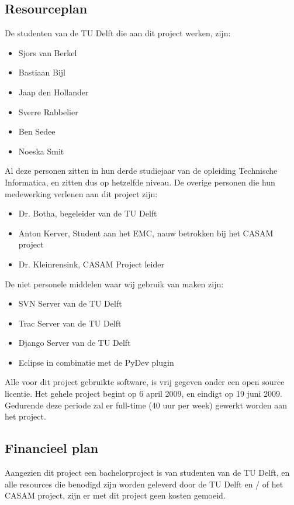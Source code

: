 \subsection{Resourceplan}
De studenten van de TU Delft die aan dit project werken, zijn:
\begin{itemize}
	\item Sjors van Berkel
	\item Bastiaan Bijl
	\item Jaap den Hollander
	\item Sverre Rabbelier
	\item Ben Sedee
	\item Noeska Smit
\end{itemize}
Al deze personen zitten in hun derde studiejaar van de opleiding Technische Informatica, en zitten dus op hetzelfde niveau. 
De overige personen die hun medewerking verlenen aan dit project zijn:
\begin{itemize}
	\item Dr. Botha, begeleider van de TU Delft
	\item Anton Kerver, Student aan het EMC, nauw betrokken bij het CASAM project
	\item Dr. Kleinrensink, CASAM Project leider
\end{itemize}
De niet personele middelen waar wij gebruik van maken zijn:
\begin{itemize}
	\item SVN Server van de TU Delft
	\item Trac Server van de TU Delft
	\item Django Server van de TU Delft
	\item Eclipse in combinatie met de PyDev plugin
\end{itemize}
Alle voor dit project gebruikte software, is vrij gegeven onder een open source licentie.
Het gehele project begint op 6 april 2009, en eindigt op 19 juni 2009. 
Gedurende deze periode zal er full-time (40 uur per week) gewerkt worden aan het project.


\subsection{Financieel plan}
Aangezien dit project een bachelorproject is van studenten van de TU Delft, en alle resources die benodigd zijn worden geleverd door de TU Delft en / of het CASAM project, zijn er met dit project geen kosten gemoeid.
